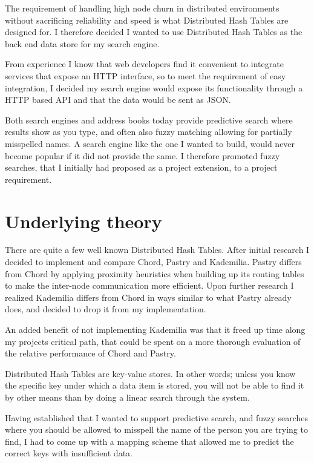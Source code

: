 The requirement of handling high node churn in distributed environments without sacrificing reliability and speed is what Distributed Hash Tables are designed for. I therefore decided I wanted to use Distributed Hash Tables as the back end data store for my search engine.

From experience I know that web developers find it convenient to integrate services that expose an HTTP interface, so to meet the requirement of easy integration, I decided my search engine would expose its functionality through a HTTP based API and that the data would be sent as JSON.

Both search engines and address books today provide predictive search where results show as you type, and often also fuzzy matching allowing for partially misspelled names. A search engine like the one I wanted to build, would never become popular if it did not provide the same. I therefore promoted fuzzy searches, that I initially had proposed as a project extension, to a project requirement.

\section{Underlying theory}
There are quite a few well known Distributed Hash Tables. After initial research I decided to implement and compare Chord, Pastry and Kademilia. Pastry differs from Chord by applying proximity heuristics when building up its routing tables to make the inter-node communication more efficient. Upon further research I realized Kademilia differs from Chord in ways similar to what Pastry already does, and decided to drop it from my implementation.

An added benefit of not implementing Kademilia was that it freed up time along my projects critical path, that could be spent on a more thorough evaluation of the relative performance of Chord and Pastry.

\mbox{}

Distributed Hash Tables are key-value stores. In other words; unless you know the specific key under which a data item is stored, you will not be able to find it by other means than by doing a linear search through the system.

Having established that I wanted to support predictive search, and fuzzy searches where you should be allowed to misspell the name of the person you are trying to find, I had to come up with a mapping scheme that allowed me to predict the correct keys with insufficient data.

